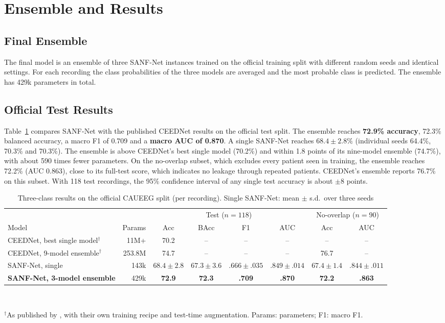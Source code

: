 \section{Ensemble and Results}

\subsection{Final Ensemble}
The final model is an ensemble of three SANF-Net instances trained on the official training split with
different random seeds and identical settings. For each recording the class probabilities of the three
models are averaged and the most probable class is predicted. The ensemble has 429k parameters in total.

\subsection{Official Test Results}
Table~\ref{tab:main} compares SANF-Net with the published CEEDNet results on the official test split. The
ensemble reaches \textbf{72.9\% accuracy}, 72.3\% balanced accuracy, a macro F1 of 0.709 and a \textbf{macro AUC
of 0.870}. A single SANF-Net reaches $68.4\pm2.8\%$ (individual seeds 64.4\%, 70.3\% and 70.3\%). The ensemble
is above CEEDNet's best single model (70.2\%) and within 1.8 points of its nine-model ensemble (74.7\%), with
about 590 times fewer parameters. On the no-overlap subset, which excludes every patient seen in training, the
ensemble reaches 72.2\% (AUC 0.863), close to its full-test score, which indicates no leakage through repeated
patients. CEEDNet's ensemble reports 76.7\% on this subset. With 118 test recordings, the 95\% confidence
interval of any single test accuracy is about $\pm8$ points.

\begin{table}[H]
\centering
\caption{Three-class results on the official CAUEEG split (per recording). Single SANF-Net: mean $\pm$ s.d.\
over three seeds}
\label{tab:main}
\small
\begin{tabular}{lrcccccc}
\toprule
& & \multicolumn{4}{c}{Test ($n=118$)} & \multicolumn{2}{c}{No-overlap ($n=90$)}\\
\cmidrule(lr){3-6}\cmidrule(lr){7-8}
Model & Params & Acc & BAcc & F1 & AUC & Acc & AUC\\
\midrule
CEEDNet, best single model$^\dagger$ & 11M+ & 70.2 & -- & -- & -- & -- & --\\
CEEDNet, 9-model ensemble$^\dagger$ & 253.8M & 74.7 & -- & -- & -- & 76.7 & --\\
\midrule
SANF-Net, single & 143k & $68.4\pm2.8$ & $67.3\pm3.6$ & $.666\pm.035$ & $.849\pm.014$ & $67.4\pm1.4$ & $.844\pm.011$\\
\textbf{SANF-Net, 3-model ensemble} & 429k & \textbf{72.9} & \textbf{72.3} & \textbf{.709} & \textbf{.870} & \textbf{72.2} & \textbf{.863}\\
\bottomrule
\end{tabular}\\[2pt]
\parbox{\textwidth}{\scriptsize $^\dagger$As published by \citet{kim2023caueeg}, with their own training recipe and
test-time augmentation. Params: parameters; F1: macro F1.}
\end{table}

